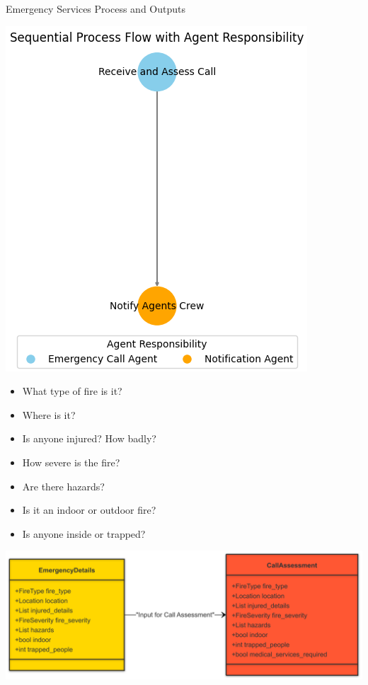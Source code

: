 \begin{frame}{Emergency Services Process and Outputs}
        \begin{minipage}[b]{0.45\textwidth}
            \centering
            \includegraphics[width=0.75\linewidth]{figures/emergency_services_crew_flow.png}
        \end{minipage}
        \hfill
        \begin{minipage}[b]{0.5\textwidth}
            \begin{itemize}
                \item What type of fire is it?
                \item Where is it? 
                \item Is anyone injured? How badly? 
                \item How severe is the fire? 
                \item Are there hazards? 
                \item Is it an indoor or outdoor fire? 
                \item Is anyone inside or trapped? 
            \end{itemize}
            \vfill
        \end{minipage}
        \centering
            \includegraphics[width=0.7\linewidth]{figures/Emergency-Crew-Diagram.png}
\end{frame}


